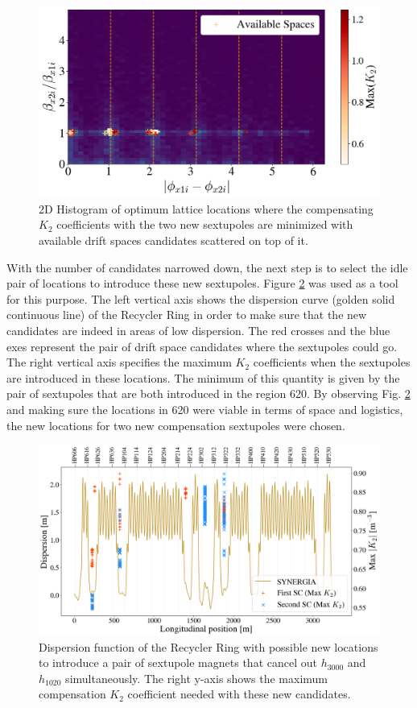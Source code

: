 \begin{figure}[H]
    \centering
    \includegraphics[width=\columnwidth]{chapter4/constrain1_avail.png}
    \caption{2D Histogram of optimum lattice locations where the compensating $K_2$ coefficients with the two new sextupoles are minimized with available drift spaces candidates scattered on top of it.}
    \label{fig:add2c2}
\end{figure}

With the number of candidates narrowed down, the next step is to select the idle pair of locations to introduce these new sextupoles. Figure \ref{fig:dxnewsexts} was used as a tool for this purpose. The left vertical axis shows the dispersion curve (golden solid continuous line) of the Recycler Ring in order to make sure that the new candidates are indeed in areas of low dispersion. The red crosses and the blue exes represent the pair of drift space candidates where the sextupoles could go. The right vertical axis specifies the maximum $K_2$ coefficients when the sextupoles are introduced in these locations. The minimum of this quantity is given by the pair of sextupoles that are both introduced in the region 620. By observing Fig. \ref{fig:dxnewsexts} and making sure the locations in 620 were viable in terms of space and logistics, the new locations for two new compensation sextupoles were chosen. 

\begin{figure}[H]
    \centering
    \includegraphics[width=\columnwidth]{chapter4/new_sexts_dx.png}
    \caption{Dispersion function of the Recycler Ring with possible new locations to introduce a pair of sextupole magnets that cancel out $h_{3000}$ and $h_{1020}$ simultaneously. The right y-axis shows the maximum compensation $K_2$ coefficient needed with these new candidates.}
    \label{fig:dxnewsexts}
\end{figure}

